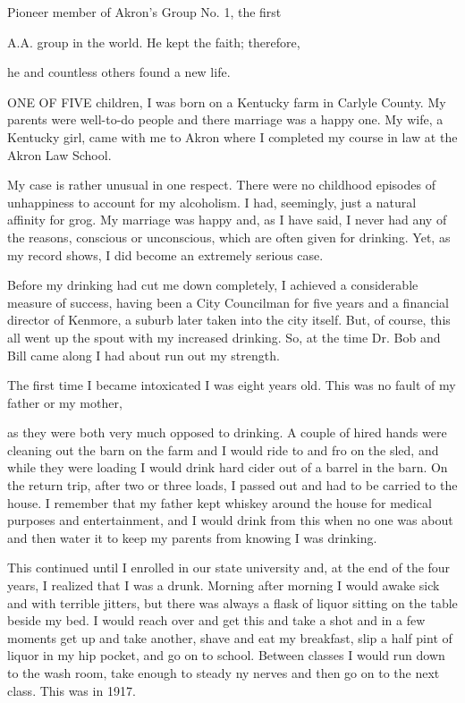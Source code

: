 
\begin{biblechapter}
Pioneer member of Akron’s Group No. 1, the first

A.A. group in the world. He kept the faith; therefore,

he and countless others found a new life.

      ONE OF FIVE children, I was born on a Kentucky farm in Carlyle County. My parents were well-to-do people and there marriage was a happy one. My wife, a Kentucky girl, came with me to Akron where I completed my course in law at the Akron Law School.

My case is rather unusual in one respect. There were no childhood episodes of unhappiness to account for my alcoholism. I had, seemingly, just a natural affinity for grog. My marriage was happy and, as I have said, I never had any of the reasons, conscious or unconscious, which are often given for drinking. Yet, as my record shows, I did become an extremely serious case.

Before my drinking had cut me down completely, I achieved a considerable measure of success, having been a City Councilman for five years and a financial director of Kenmore, a suburb later taken into the city itself. But, of course, this all went up the spout with my increased drinking. So, at the time Dr. Bob and Bill came along I had about run out my strength.

The first time I became intoxicated I was eight years old. This was no fault of my father or my mother,

as they were both very much opposed to drinking. A couple of hired hands were cleaning out the barn on the farm and I would ride to and fro on the sled, and while they were loading I would drink hard cider out of a barrel in the barn. On the return trip, after two or three loads, I passed out and had to be carried to the house. I remember that my father kept whiskey around the house for medical purposes and entertainment, and I would drink from this when no one was about and then water it to keep my parents from knowing I was drinking.

This continued until I enrolled in our state university and, at the end of the four years, I realized that I was a drunk. Morning after morning I would awake sick and with terrible jitters, but there was always a flask of liquor sitting on the table beside my bed. I would reach over and get this and take a shot and in a few moments get up and take another, shave and eat my breakfast, slip a half pint of liquor in my hip pocket, and go on to school. Between classes I would run down to the wash room, take enough to steady ny nerves and then go on to the next class. This was in 1917.


\end{biblechapter}
